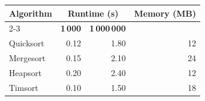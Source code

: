 \documentclass[11pt]{article}\usepackage[paperwidth=12cm,paperheight=6cm,margin=5mm]{geometry}\pagestyle{empty}\usepackage{booktabs}
\begin{document}
\begin{tabularx}{\linewidth}{Xrrr}
  \toprule
  \multirow{2}{*}{\textbf{Algorithm}} & \multicolumn{2}{c}{\textbf{Runtime (s)}} & \multirow{2}{*}{\textbf{Memory (MB)}} \\
  \cmidrule{2-3}
                     & \textbf{1\,000} & \textbf{1\,000\,000} &    \\
  \midrule
  Quicksort          & 0.12            & 1.80                 & 12 \\
  \rowcolor{black!6}
  Mergesort          & 0.15            & 2.10                 & 24 \\
  Heapsort           & 0.20            & 2.40                 & 12 \\
  \rowcolor{black!6}
  Timsort            & 0.10            & 1.50                 & 18 \\
  \bottomrule
\end{tabularx}
\end{document}

